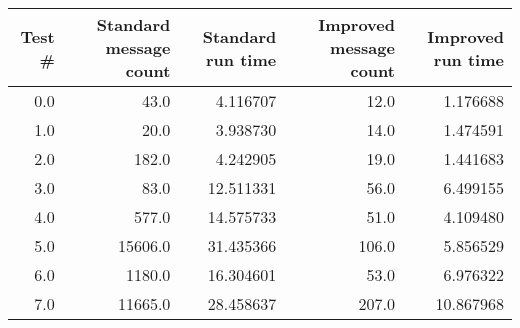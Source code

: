 \begin{tabular}{rrrrr}
\toprule
 Test \# &  Standard message count &  Standard run time &  Improved message count &  Improved run time \\
\midrule
    0.0 &                    43.0 &           4.116707 &                    12.0 &           1.176688 \\
    1.0 &                    20.0 &           3.938730 &                    14.0 &           1.474591 \\
    2.0 &                   182.0 &           4.242905 &                    19.0 &           1.441683 \\
    3.0 &                    83.0 &          12.511331 &                    56.0 &           6.499155 \\
    4.0 &                   577.0 &          14.575733 &                    51.0 &           4.109480 \\
    5.0 &                 15606.0 &          31.435366 &                   106.0 &           5.856529 \\
    6.0 &                  1180.0 &          16.304601 &                    53.0 &           6.976322 \\
    7.0 &                 11665.0 &          28.458637 &                   207.0 &          10.867968 \\
\bottomrule
\end{tabular}
